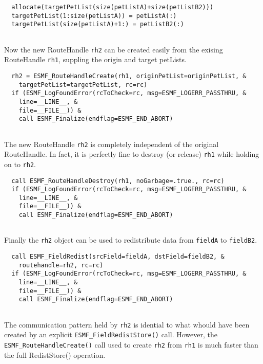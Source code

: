  \begin{verbatim}
  allocate(targetPetList(size(petListA)+size(petListB2)))
  targetPetList(1:size(petListA)) = petListA(:)
  targetPetList(size(petListA)+1:) = petListB2(:)
 
\end{verbatim}
 

   Now the new RouteHandle {\tt rh2} can be created easily from the exising 
   RouteHandle {\tt rh1}, suppling the origin and target petLists. 

 \begin{verbatim}
  rh2 = ESMF_RouteHandleCreate(rh1, originPetList=originPetList, &
    targetPetList=targetPetList, rc=rc)
  if (ESMF_LogFoundError(rcToCheck=rc, msg=ESMF_LOGERR_PASSTHRU, &
    line=__LINE__, &
    file=__FILE__)) &
    call ESMF_Finalize(endflag=ESMF_END_ABORT)
 
\end{verbatim}
 

   The new RouteHandle {\tt rh2} is completely independent of the original
   RouteHandle. In fact, it is perfectly fine to destroy (or release) {\tt rh1} 
   while holding on to {\tt rh2}. 

 \begin{verbatim}
  call ESMF_RouteHandleDestroy(rh1, noGarbage=.true., rc=rc)
  if (ESMF_LogFoundError(rcToCheck=rc, msg=ESMF_LOGERR_PASSTHRU, &
    line=__LINE__, &
    file=__FILE__)) &
    call ESMF_Finalize(endflag=ESMF_END_ABORT)
 
\end{verbatim}
 

   Finally the {\tt rh2} object can be used to redistribute data from 
   {\tt fieldA} to {\tt fieldB2}.  

 \begin{verbatim}
  call ESMF_FieldRedist(srcField=fieldA, dstField=fieldB2, &
    routehandle=rh2, rc=rc)
  if (ESMF_LogFoundError(rcToCheck=rc, msg=ESMF_LOGERR_PASSTHRU, &
    line=__LINE__, &
    file=__FILE__)) &
    call ESMF_Finalize(endflag=ESMF_END_ABORT)
 
\end{verbatim}
 

   The communication pattern held by {\tt rh2}
   is idential to what whould have been created by an explicit 
   {\tt ESMF\_FieldRedistStore()} call. However, the 
   {\tt ESMF\_RouteHandleCreate()} call used to create {\tt rh2} from {\tt rh1}
   is much faster than the full RedistStore() operation.
\setlength{\parskip}{\oldparskip}
\setlength{\parindent}{\oldparindent}
\setlength{\baselineskip}{\oldbaselineskip}
